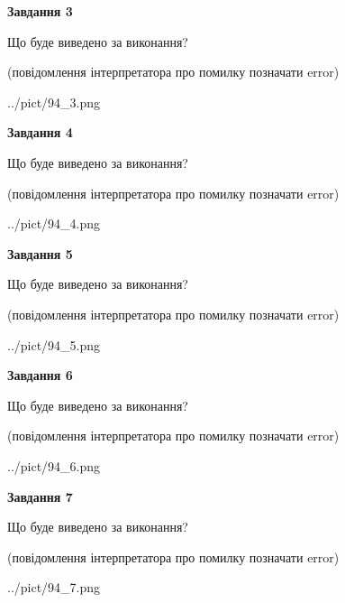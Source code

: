 \documentclass[12pt, ukrainian]{article}
\begin{document}
{\begin {large}
{\begin {center}\textbf{Завдання 3}\end {center}}\par
Що буде виведено за виконання?\par
 (повідомлення інтерпретатора про помилку позначати error)\par
\begin{center}
	{../pict/94_3.png}
\end{center}
\newpage

{\begin {center}\textbf{Завдання 4}\end {center}}\par
Що буде виведено за виконання?\par
 (повідомлення інтерпретатора про помилку позначати error)\par
\begin{center}
	{../pict/94_4.png}
\end{center}
\newpage

{\begin {center}\textbf{Завдання 5}\end {center}}\par
Що буде виведено за виконання?\par
 (повідомлення інтерпретатора про помилку позначати error)\par
\begin{center}
	{../pict/94_5.png}
\end{center}
\newpage

{\begin {center}\textbf{Завдання 6}\end {center}}\par
Що буде виведено за виконання?\par
 (повідомлення інтерпретатора про помилку позначати error)\par
\begin{center}
	{../pict/94_6.png}
\end{center}
\newpage

{\begin {center}\textbf{Завдання 7}\end {center}}\par
Що буде виведено за виконання?\par
 (повідомлення інтерпретатора про помилку позначати error)\par
\begin{center}
	{../pict/94_7.png}
\end{center}
\newpage


\end{large}}
\end{document}

